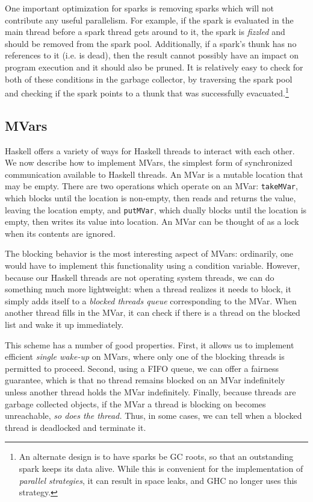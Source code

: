 One important optimization for sparks is removing sparks which will not
contribute any useful parallelism.  For example, if the spark is
evaluated in the main thread before a spark thread gets around to it,
the spark is \emph{fizzled} and should be removed from the spark pool.
Additionally, if a spark's thunk has no references to it (i.e. is dead),
then the result cannot possibly have an impact on program execution and
it should also be pruned.  It is relatively easy to check for both of
these conditions in the garbage collector, by traversing the spark pool
and checking if the spark points to a thunk that was successfully evacuated.\footnote{An alternate design is to have sparks be GC roots, so that an outstanding spark keeps its data alive. While this is convenient for the implementation of \emph{parallel strategies}, it can result in space leaks, and GHC no longer uses this strategy.}

\subsection{MVars}

Haskell offers a variety of ways for Haskell threads to interact with
each other.  We now describe how to implement MVars, the simplest form
of synchronized communication available to Haskell threads.  An MVar is
a mutable location that may be empty.  There are two operations which
operate on an MVar: \verb|takeMVar|, which blocks until the location is
non-empty, then reads and returns the value, leaving the location empty,
and \verb|putMVar|, which dually blocks until the location is empty,
then writes its value into location.  An MVar can be thought of as a
lock when its contents are ignored.

The blocking behavior is the most interesting aspect of MVars:
ordinarily, one would have to implement this functionality using a
condition variable.  However, because our Haskell threads are not
operating system threads, we can do something much more lightweight:
when a thread realizes it needs to block, it simply adds itself to a
\emph{blocked threads queue} corresponding to the MVar.  When another
thread fills in the MVar, it can check if there is a thread on the
blocked list and wake it up immediately.

This scheme has a number of good properties.  First, it allows us
to implement efficient \emph{single wake-up} on MVars, where only one of
the blocking threads is permitted to proceed. Second, using a FIFO
queue, we can offer a fairness guarantee, which is that no thread
remains blocked on an MVar indefinitely unless another thread holds the
MVar indefinitely.  Finally, because threads are garbage collected
objects, if the MVar a thread is blocking on becomes unreachable,
\emph{so does the thread.}  Thus, in some cases, we can tell when
a blocked thread is deadlocked and terminate it.

